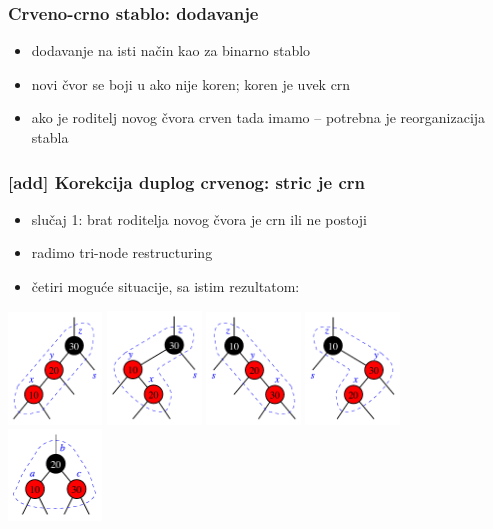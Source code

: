 \documentclass[compress,aspectratio=169]{beamer}
\begin{document}
\begin{frame}[fragile]
  \frametitle{Crveno-crno stablo: dodavanje}
  \begin{itemize}
    \item dodavanje na isti način kao za binarno stablo 
    \item novi čvor se boji u  ako nije koren; koren je uvek crn
      \item ako je roditelj novog čvora crven tada imamo  -- potrebna je reorganizacija stabla
  \end{itemize}
\end{frame}

\begin{frame}[fragile]
  \frametitle{[add] Korekcija duplog crvenog: stric je crn}
  \begin{itemize}
    \item slučaj 1: brat roditelja novog čvora je crn ili ne postoji
    \item radimo tri-node restructuring
    \item četiri moguće situacije, sa istim rezultatom:
  \end{itemize}
  \begin{center}
    \includegraphics[width=2.5cm]{asp-11-pic39a.pdf}
    \includegraphics[width=2.5cm]{asp-11-pic39b.pdf}
    \includegraphics[width=2.5cm]{asp-11-pic39c.pdf}
    \includegraphics[width=2.5cm]{asp-11-pic39d.pdf} \\
    \includegraphics[width=2.5cm]{asp-11-pic39e.pdf}
  \end{center}
\end{frame}
\end{document}
